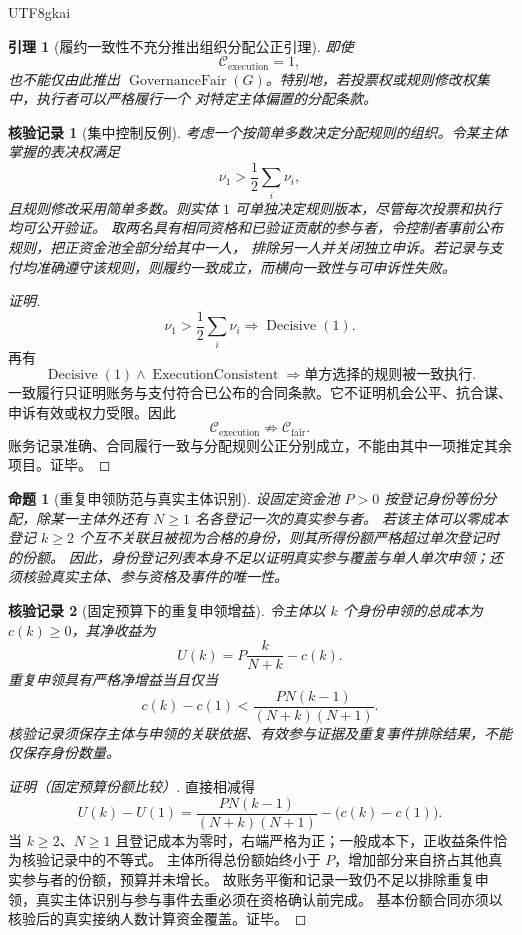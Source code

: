 \documentclass[12pt,a4paper,openany]{report}
\newtheorem{lemma}{引理}[chapter]
\newtheorem{proposition}{命题}[chapter]
\newtheorem{Certificate}{核验记录}[chapter]
\DeclareMathOperator{\ExecutionConsistent}{ExecutionConsistent}
\DeclareMathOperator{\GovernanceFair}{GovernanceFair}
\begin{document}
\begin{CJK*}{UTF8}{gkai}
\begin{lemma}[履约一致性不充分推出组织分配公正引理]
\label{lem:execution-not-fairness}
即使
\[
  \mathcal C_{\mathrm{execution}}=1,
\]
也不能仅由此推出 \(\GovernanceFair(G)\)。特别地，若投票权或规则修改权集中，执行者可以严格履行一个
对特定主体偏置的分配条款。
\end{lemma}

\begin{Certificate}[集中控制反例]
考虑一个按简单多数决定分配规则的组织。令某主体掌握的表决权满足
\[
  \nu_1>\frac12\sum_i\nu_i,
\]
且规则修改采用简单多数。则实体 \(1\) 可单独决定规则版本，尽管每次投票和执行均可公开验证。
取两名具有相同资格和已验证贡献的参与者，令控制者事前公布规则，把正资金池全部分给其中一人，
排除另一人并关闭独立申诉。若记录与支付均准确遵守该规则，则履约一致成立，而横向一致性与可申诉性失败。
\end{Certificate}

\begin{proof}[证明]
\[
  \nu_1>\frac12\sum_i\nu_i
  \Longrightarrow
  \operatorname{Decisive}(1).
\]
再有
\[
  \operatorname{Decisive}(1)
  \wedge
  \ExecutionConsistent
  \Longrightarrow
  \text{单方选择的规则被一致执行}.
\]
一致履行只证明账务与支付符合已公布的合同条款。它不证明机会公平、抗合谋、申诉有效或权力受限。因此
\[
  \mathcal C_{\mathrm{execution}}
  \not\Longrightarrow
  \mathcal C_{\mathrm{fair}}.
\]
账务记录准确、合同履行一致与分配规则公正分别成立，不能由其中一项推定其余项目。证毕。
\end{proof}

\begin{proposition}[重复申领防范与真实主体识别]
\label{prop:duplicate-claim-gate}
设固定资金池 \(P>0\) 按登记身份等份分配，除某一主体外还有 \(N\ge1\) 名各登记一次的真实参与者。
若该主体可以零成本登记 \(k\ge2\) 个互不关联且被视为合格的身份，则其所得份额严格超过单次登记时的份额。
因此，身份登记列表本身不足以证明真实参与覆盖与单人单次申领；还须核验真实主体、参与资格及事件的唯一性。
\end{proposition}

\begin{Certificate}[固定预算下的重复申领增益]
令主体以 \(k\) 个身份申领的总成本为 \(c(k)\ge0\)，其净收益为
\[
  U(k)=P\frac{k}{N+k}-c(k).
\]
重复申领具有严格净增益当且仅当
\[
  c(k)-c(1)
  <
  \frac{PN(k-1)}{(N+k)(N+1)}.
\]
核验记录须保存主体与申领的关联依据、有效参与证据及重复事件排除结果，不能仅保存身份数量。
\end{Certificate}

\begin{proof}[证明（固定预算份额比较）]
直接相减得
\[
  U(k)-U(1)
  =\frac{PN(k-1)}{(N+k)(N+1)}
  -\bigl(c(k)-c(1)\bigr).
\]
当 \(k\ge2\)、\(N\ge1\) 且登记成本为零时，右端严格为正；一般成本下，正收益条件恰为核验记录中的不等式。
主体所得总份额始终小于 \(P\)，增加部分来自挤占其他真实参与者的份额，预算并未增长。
故账务平衡和记录一致仍不足以排除重复申领，真实主体识别与参与事件去重必须在资格确认前完成。
基本份额合同亦须以核验后的真实接纳人数计算资金覆盖。证毕。
\end{proof}


\end{CJK*}
\end{document}
